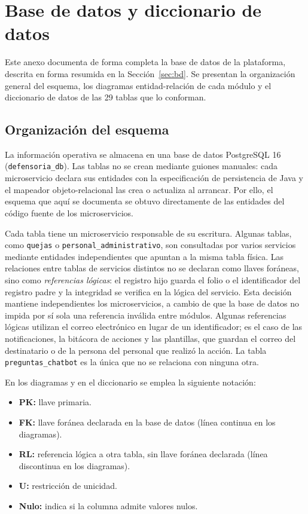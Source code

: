 \chapter{Base de datos y diccionario de datos}
\label{anx:base_datos}

Este anexo documenta de forma completa la base de datos de la plataforma, descrita en forma resumida en la Sección~\ref{sec:bd}. Se presentan la organización general del esquema, los diagramas entidad-relación de cada módulo y el diccionario de datos de las 29 tablas que lo conforman.

\section{Organización del esquema}
La información operativa se almacena en una base de datos PostgreSQL 16 (\texttt{defensoria\_db}). Las tablas no se crean mediante guiones manuales: cada microservicio declara sus entidades con la especificación de persistencia de Java y el mapeador objeto-relacional las crea o actualiza al arrancar. Por ello, el esquema que aquí se documenta se obtuvo directamente de las entidades del código fuente de los microservicios.

Cada tabla tiene un microservicio responsable de su escritura. Algunas tablas, como \texttt{quejas} o \texttt{personal\_administrativo}, son consultadas por varios servicios mediante entidades independientes que apuntan a la misma tabla física. Las relaciones entre tablas de servicios distintos no se declaran como llaves foráneas, sino como \emph{referencias lógicas}: el registro hijo guarda el folio o el identificador del registro padre y la integridad se verifica en la lógica del servicio. Esta decisión mantiene independientes los microservicios, a cambio de que la base de datos no impida por sí sola una referencia inválida entre módulos. Algunas referencias lógicas utilizan el correo electrónico en lugar de un identificador; es el caso de las notificaciones, la bitácora de acciones y las plantillas, que guardan el correo del destinatario o de la persona del personal que realizó la acción. La tabla \texttt{preguntas\_chatbot} es la única que no se relaciona con ninguna otra.

En los diagramas y en el diccionario se emplea la siguiente notación:

\begin{itemize}
	\item \textbf{PK:} llave primaria.
	\item \textbf{FK:} llave foránea declarada en la base de datos (línea continua en los diagramas).
	\item \textbf{RL:} referencia lógica a otra tabla, sin llave foránea declarada (línea discontinua en los diagramas).
	\item \textbf{U:} restricción de unicidad.
	\item \textbf{Nulo:} indica si la columna admite valores nulos.
\end{itemize}

